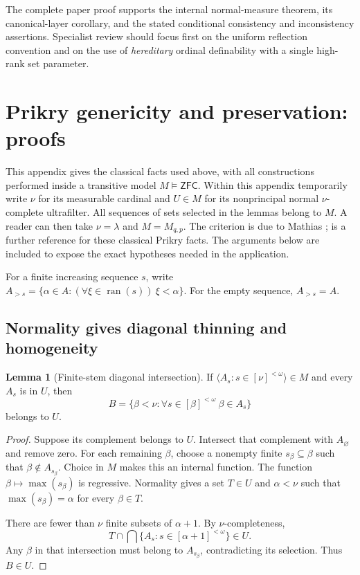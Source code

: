 \documentclass[11pt,letterpaper]{article}
\theoremstyle{definition}
\newtheorem{lemma}[definition]{Lemma}
\numberwithin{equation}{section}
\newcommand{\ZFC}{\mathsf{ZFC}}
\newcommand{\ran}{\operatorname{ran}}
\begin{document}
The complete paper proof supports the internal normal-measure theorem,
its canonical-layer corollary, and the stated conditional consistency
and inconsistency assertions. Specialist review should focus first on
the uniform reflection convention and on the use of \emph{hereditary}
ordinal definability with a single high-rank set parameter.

\appendix
\section{Prikry genericity and preservation: proofs}\label{sec:prikryproof}

This appendix gives the classical facts used above, with all
constructions performed inside a transitive model $M\models\ZFC$.
Within this appendix temporarily write $\nu$ for its measurable
cardinal and $U\in M$ for its nonprincipal normal $\nu$-complete
ultrafilter. All sequences of sets selected in the lemmas belong to
$M$. A reader can then take $\nu=\lambda$ and $M=M_{q,p}$.
The criterion is due to Mathias \cite{mathias};
\cite[Section~3]{benhamou} is a further reference for these classical
Prikry facts. The arguments below are included to expose the exact
hypotheses needed in the application.

For a finite increasing sequence $s$, write
$A_{>s}=\{\alpha\in A:(\forall\xi\in\ran(s))\ \xi<\alpha\}$.
For the empty sequence, $A_{>s}=A$.

\subsection{Normality gives diagonal thinning and homogeneity}

\begin{lemma}[Finite-stem diagonal intersection]\label{lem:diag}
If $\langle A_s:s\in[\nu]^{<\omega}\rangle\in M$ and every $A_s$ is in
$U$, then
\[
 B=\{\beta<\nu:\forall s\in[\beta]^{<\omega}\ \beta\in A_s\}
\]
belongs to $U$.
\end{lemma}

\begin{proof}
Suppose its complement belongs to $U$. Intersect that complement with
$A_\varnothing$ and remove zero. For each remaining $\beta$, choose a
nonempty finite $s_\beta\subseteq\beta$ such that
$\beta\notin A_{s_\beta}$. Choice in $M$ makes this an internal
function. The function $\beta\mapsto\max(s_\beta)$ is regressive.
Normality gives a set $T\in U$ and $\alpha<\nu$ such that
$\max(s_\beta)=\alpha$ for every $\beta\in T$.

There are fewer than $\nu$ finite subsets of $\alpha+1$.
By $\nu$-completeness,
\[
 T\cap\bigcap\{A_s:s\in[\alpha+1]^{<\omega}\}\in U.
\]
Any $\beta$ in that intersection must belong to $A_{s_\beta}$,
contradicting its selection. Thus $B\in U$.
\end{proof}
\end{document}
